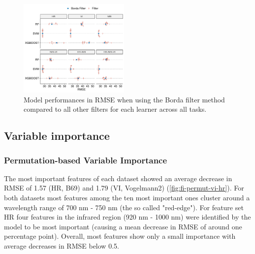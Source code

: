 \documentclass[letterpaper, peerreview]{IEEEtran}
\begin{document}
\begin{figure} [t!]
	\centering
	\begin{center}
		\includegraphics[width=0.48\textwidth] {filter-effect-all-vs-borda-filter-1.pdf}
		\caption{Model performances in RMSE when using the Borda filter method compared to all other filters for each learner across all tasks.}\label{fig:filter-effects-borda}
	\end{center}
\end{figure}

\subsection{Variable importance}

\subsubsection{Permutation-based Variable Importance}


The most important features of each dataset showed an average decrease in RMSE of 1.57 (HR, B69) and 1.79 (VI, Vogelmann2) (\autoref{fig:fi-permut-vi-hr}).
For both datasets most features among the ten most important ones cluster around a wavelength range of 700 nm - 750 nm (the so called "red-edge").
For feature set HR four features in the infrared region (920 nm - 1000 nm) were identified by the model to be most important (causing a mean decrease in RMSE of around one percentage point).
Overall, most features show only a small importance with average decreases in RMSE below 0.5.
\end{document}
